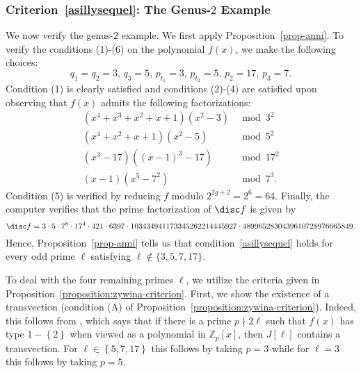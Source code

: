 %
%

\subsubsection{Criterion~\eqref{asillysequel}: The Genus-$2$ Example}

We now verify the genus-$2$ example. We first apply Proposition~\ref{prop-anni}. To verify the conditions (1)-(6) on the polynomial $f(x)$, we make the following choices:
$$q_1 = q_2 = 3,\, q_3 = 5,\, p_{t_1} = 3,\, p_{t_2} = 5,\, p_2 = 17,\, p_3 = 7.$$ 
Condition (1) is clearly satisfied and
conditions (2)-(4) are satisfied upon observing that $f(x)$ admits the following factorizations:
\begin{align*}
( x^4 + x^3 + x^2 + x + 1 )( x^2 - 3 ) & \bmod 3^2 \\
	( x^4 + x^2 + x + 1 )( x^2 - 5 ) & \bmod 5^2 \\
	( x^3 - 17 ) ( ( x-1 )^3 - 17 ) & \bmod 17^2 \\
	( x-1 )( x^5 - 7^2 ) & \bmod 7^3.
\end{align*}
Condition (5) is verified by reducing $f$ modulo $2^{2g+2} = 2^6 = 64$.
Finally, the computer verifies that the prime factorization of $\disc f$ is given by
\begin{equation*}
	\disc f = 3 \cdot 5 \cdot 7^8 \cdot 17^4 \cdot 421 \cdot 6397 \cdot 103434941173345262214445927 \cdot 4899652830439610728976665849.
	\end{equation*}
Hence, Proposition~\ref{prop-anni} tells us that condition~\eqref{asillysequel} holds for every odd prime $\ell$ satisfying $\ell \not\in \{3,5,7,17\}$.

To deal with the four remaining primes $\ell$, we utilize the criteria given in Proposition~\ref{proposition:zywina-criterion}. 
First, we show the existence of a transvection (condition (A) of Proposition~\ref{proposition:zywina-criterion}). 
Indeed, this follows from \cite[Lemma 2.9]{anni2017constructing}, which says that if there is a prime $p \nmid 2 \ell$ such that $f(x)$ has type $1 - \left\{ 2 \right\}$ when viewed as a polynomial in $\mathbb Z_p[x]$, then $J[\ell]$ contains a transvection.
For $\ell \in \left\{ 5,7,17 \right\}$ this follows by taking $p = 3$ while for $\ell =3$ this follows by taking $p = 5$.

